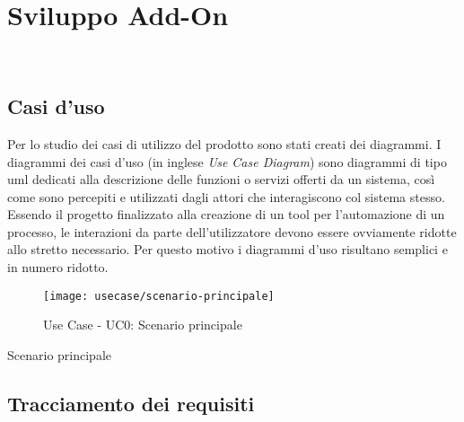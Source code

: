 
\chapter{Sviluppo Add-On}
\label{cap:sviluppo-addon}

\\

\section{Casi d'uso}

Per lo studio dei casi di utilizzo del prodotto sono stati creati dei diagrammi.
I diagrammi dei casi d'uso (in inglese \emph{Use Case Diagram}) sono diagrammi di tipo \gls{uml} dedicati alla descrizione delle funzioni o servizi offerti da un sistema, così come sono percepiti e utilizzati dagli attori che interagiscono col sistema stesso.
Essendo il progetto finalizzato alla creazione di un tool per l'automazione di un processo, le interazioni da parte dell'utilizzatore devono essere ovviamente ridotte allo stretto necessario. Per questo motivo i diagrammi d'uso risultano semplici e in numero ridotto.

\begin{figure}[!h] 
	\centering 
	\texttt{[image: usecase/scenario-principale]} 
	\caption{Use Case - UC0: Scenario principale}
\end{figure}

\begin{usecase}{0}{Scenario principale}
	\label{uc:scenario-principale}
\end{usecase}

\section{Tracciamento dei requisiti}

